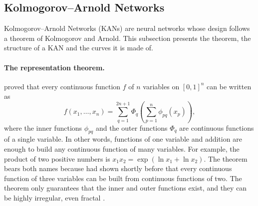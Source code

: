 \subsection{Kolmogorov--Arnold Networks}
\label{sec:bg-kan}

Kolmogorov--Arnold Networks (KANs) \cite{liu2025kan} are neural networks whose design follows a
theorem of Kolmogorov and Arnold. This subsection presents the theorem, the structure of a KAN and
the curves it is made of.

\paragraph{The representation theorem.}
\citet{kolmogorov1957representation} proved that every continuous function $f$ of $n$ variables on
$[0, 1]^n$ can be written as
\begin{equation}
  f(x_1, \dots, x_n) = \sum_{q=1}^{2n+1} \Phi_q\!\left( \sum_{p=1}^{n} \phi_{pq}(x_p) \right),
  \label{eq:bg-ka}
\end{equation}
where the inner functions $\phi_{pq}$ and the outer functions $\Phi_q$ are continuous functions of
a single variable. In other words, functions of one variable and addition are enough to build any
continuous function of many variables. For example, the product of two positive numbers is
$x_1 x_2 = \exp(\ln x_1 + \ln x_2)$. The theorem bears both names because
\citet{arnold1957functions} had shown shortly before that every continuous function of three
variables can be built from continuous functions of two. The theorem only guarantees that the inner
and outer functions exist, and they can be highly irregular, even fractal \cite{liu2025kan}.

